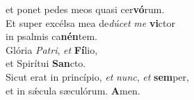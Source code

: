 \oddverse et ponet pedes meos quasi cer\textbf{vó}rum.\\
\evenverse Et super excélsa mea de\textit{dú}\textit{cet} \textit{me} \textbf{vi}ctor~\*\\
\evenverse in psalmis ca\textbf{nén}tem.\\
\oddverse Glória \textit{Pa}\textit{tri}, \textit{et} \textbf{Fí}lio,~\*\\
\oddverse et Spirítui \textbf{San}cto.\\
\evenverse Sicut erat in princípio, \textit{et} \textit{nunc}, \textit{et} \textbf{sem}per,~\*\\
\evenverse et in sǽcula sæculórum. \textbf{A}men.\\
